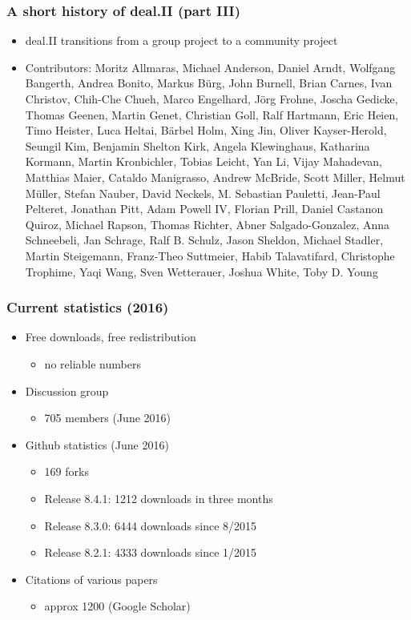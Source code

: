 \begin{frame}
  \frametitle{A short history of deal.II (part III)}
  \begin{itemize}
  \item deal.II transitions from a group project to a
    community project
  \item \footnotesize Contributors: Moritz Allmaras, Michael Anderson,
    Daniel Arndt,
    Wolfgang Bangerth, Andrea Bonito, Markus Bürg, John Burnell, Brian
    Carnes, Ivan Christov, Chih-Che Chueh, Marco Engelhard, Jörg
    Frohne, Joscha Gedicke, Thomas Geenen, Martin Genet, Christian Goll, Ralf
    Hartmann, Eric Heien, Timo Heister, Luca Heltai, Bärbel Holm,
    Xing Jin, Oliver Kayser-Herold, Seungil Kim, Benjamin Shelton
    Kirk, Angela Klewinghaus, Katharina Kormann, Martin Kronbichler,
    Tobias Leicht, Yan Li, Vijay Mahadevan, Matthias Maier, Cataldo
    Manigrasso, Andrew McBride, Scott Miller, Helmut Müller, Stefan
    Nauber, David Neckels, M. Sebastian Pauletti, Jean-Paul Pelteret,
    Jonathan Pitt, Adam Powell IV, Florian Prill, Daniel Castanon
    Quiroz, Michael Rapson, Thomas Richter, Abner Salgado-Gonzalez,
    Anna Schneebeli, Jan Schrage, Ralf B. Schulz, Jason Sheldon,
    Michael Stadler, Martin Steigemann, Franz-Theo Suttmeier, Habib
    Talavatifard, Christophe Trophime, Yaqi Wang, Sven Wetterauer,
    Joshua White, Toby D. Young
  \end{itemize}
\end{frame}

\begin{frame}
  \frametitle{Current statistics (2016)}
  \begin{itemize}
  \item Free downloads, free redistribution
    \begin{itemize}
    \item no reliable numbers
    \end{itemize}
  \item Discussion group
    \begin{itemize}
    \item 705 members (June 2016)
    \end{itemize}
  \item Github statistics (June 2016)
    \begin{itemize}
    \item 169 forks
    \item Release 8.4.1: 1212 downloads in three months
    \item Release 8.3.0: 6444 downloads since 8/2015
    \item Release 8.2.1: 4333 downloads since 1/2015
    \end{itemize}
  \item Citations of various papers
    \begin{itemize}
    \item approx 1200 (Google Scholar)
    \end{itemize}
  \end{itemize}
\end{frame}

